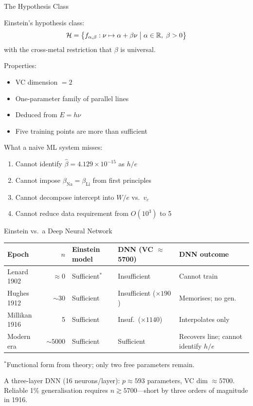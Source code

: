 \documentclass[aspectratio=169]{beamer}
\begin{document}
\begin{frame}{The Hypothesis Class}

Einstein's hypothesis class:
\[
  \mathcal{H} = \bigl\{f_{\alpha,\beta}: \nu \mapsto \alpha + \beta\nu
  \bigm| \alpha\in\mathbb{R},\;\beta>0\bigr\}
\]
with the cross-metal restriction that $\beta$ is universal.

\medskip
Properties:
\begin{itemize}
  \item VC dimension $= 2$
  \item One-parameter family of parallel lines
  \item Deduced  from $E = h\nu$
  \item Five training points are more than sufficient
\end{itemize}

\medskip
What a naive ML system misses:
\begin{enumerate}
  \item Cannot identify $\hat\beta = 4.129\times10^{-15}$ as $h/e$
  \item Cannot impose $\beta_{\mathrm{Na}} = \beta_{\mathrm{Li}}$
    from first principles
  \item Cannot decompose intercept into $W/e$ vs.\ $v_c$
  \item Cannot reduce data requirement from $O(10^3)$ to 5
\end{enumerate}

\end{frame}

\begin{frame}{Einstein vs.\ a Deep Neural Network}

\begin{center}
\small
\begin{tabular}{p{2.5cm}rp{2.7cm}p{2.8cm}p{3.5cm}}
\toprule
Epoch & $n$ & Einstein model & DNN (VC $\approx$ 5700) & DNN outcome \\
\midrule
Lenard 1902   & $\approx 0$  & Sufficient$^*$ & Insufficient
  & Cannot train \\
Hughes 1912   & $\sim 30$    & Sufficient
  & Insufficient ($\times 190$) & Memorises; no gen. \\
Millikan 1916 & 5            & Sufficient
  & Insuf.\ ($\times 1140$) & Interpolates only \\
Modern era    & $\sim 5000$  & Sufficient
  & Sufficient & Recovers line; cannot identify $h/e$ \\
\bottomrule
\end{tabular}
\end{center}

\medskip
{\small $^*$Functional form from theory; only two free parameters remain.}

\medskip
A three-layer DNN (16 neurons/layer): $p \approx 593$ parameters,
VC dim $\approx 5700$. Reliable 1\% generalisation requires
$n \gtrsim 5700$---short by three orders of magnitude in 1916.

\end{frame}
\end{document}
